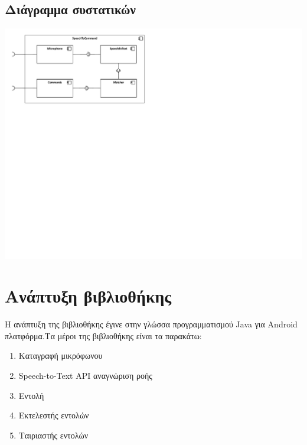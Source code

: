 \documentclass[oneside, 12pt]{book}
\begin{document}
\subsection{Διάγραμμα συστατικών}\label{sec:διάγραμμα-συστατικών}
\includegraphics{uml/library_uml_component_diagram.pdf}
\section{Ανάπτυξη βιβλιοθήκης}
Η ανάπτυξη της βιβλιοθήκης έγινε στην γλώσσα προγραμματισμού Java για Android πλατφόρμα.Τα μέροι της βιβλιοθήκης είναι τα παρακάτω:
\begin{enumerate}
  \item Καταγραφή μικρόφωνου
  \item Speech-to-Text API αναγνώριση ροής
  \item Εντολή
  \item Εκτελεστής εντολών
  \item Ταιριαστής εντολών
\end{enumerate}
\end{document}
